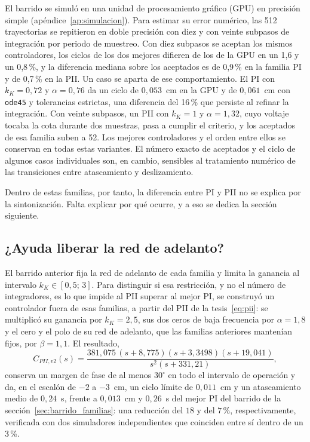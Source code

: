 El barrido se simuló en una unidad de procesamiento gráfico (GPU) en precisión simple (apéndice~\ref{ap:simulacion}). Para estimar su error numérico, las 512 trayectorias se repitieron en doble precisión con diez y con veinte subpasos de integración por periodo de muestreo. Con diez subpasos se aceptan los mismos controladores, los ciclos de los dos mejores difieren de los de la GPU en un 1,6 y un 0,8\,\%, y la diferencia mediana sobre los aceptados es de 0,9\,\% en la familia PI y de 0,7\,\% en la PII. Un caso se aparta de ese comportamiento. El PI con $k_K=0{,}72$ y $\alpha=0{,}76$ da un ciclo de $0{,}053$~cm en la GPU y de $0{,}061$~cm con \texttt{ode45} y tolerancias estrictas, una diferencia del 16\,\% que persiste al refinar la integración. Con veinte subpasos, un PII con $k_K=1$ y $\alpha=1{,}32$, cuyo voltaje tocaba la cota durante dos muestras, pasa a cumplir el criterio, y los aceptados de esa familia suben a 52. Los mejores controladores y el orden entre ellos se conservan en todas estas variantes. El número exacto de aceptados y el ciclo de algunos casos individuales son, en cambio, sensibles al tratamiento numérico de las transiciones entre atascamiento y deslizamiento.

Dentro de estas familias, por tanto, la diferencia entre PI y PII no se explica por la sintonización. Falta explicar por qué ocurre, y a eso se dedica la sección siguiente.

\subsection{¿Ayuda liberar la red de adelanto?}\label{sec:pii_v2}

El barrido anterior fija la red de adelanto de cada familia y limita la ganancia al intervalo $k_K\in[0{,}5;\,3]$. Para distinguir si esa restricción, y no el número de integradores, es lo que impide al PII superar al mejor PI, se construyó un controlador fuera de esas familias, a partir del PII de la tesis~\eqref{eq:pii}: se multiplicó su ganancia por $k_K=2{,}5$, sus dos ceros de baja frecuencia por $\alpha=1{,}8$ y el cero y el polo de su red de adelanto, que las familias anteriores mantenían fijos, por $\beta=1{,}1$. El resultado,
\begin{equation}
C_{PII,v2}(s) = \frac{381{,}075\,(s+8{,}775)(s+3{,}3498)(s+19{,}041)}{s^{2}(s+331{,}21)} ,
\label{eq:pii_v2}
\end{equation}
conserva un margen de fase de al menos $30^\circ$ en todo el intervalo de operación y da, en el escalón de $-2$ a $-3$~cm, un ciclo límite de $0{,}011$~cm y un atascamiento medio de $0{,}24$~s, frente a $0{,}013$~cm y $0{,}26$~s del mejor PI del barrido de la sección~\ref{sec:barrido_familias}: una reducción del $18$ y del $7$\,\%, respectivamente, verificada con dos simuladores independientes que coinciden entre sí dentro de un $3$\,\%.

